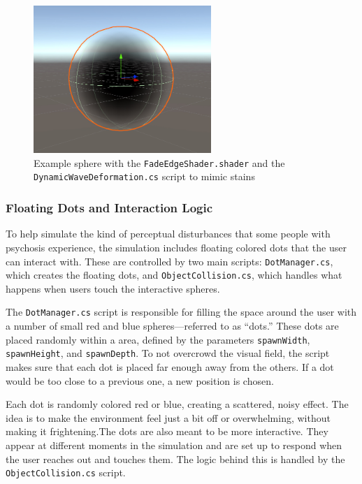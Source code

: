 \begin{figure}[h!] 
    \centering 
    \includegraphics[width=0.6\textwidth]{../../Figures/fadeedgeshader.jpg} 
    \caption{Example sphere with the \texttt{FadeEdgeShader.shader} and the \texttt{DynamicWaveDeformation.cs} script to mimic stains} 
    \label{fig:fadeedgeshader} 
\end{figure}

\subsubsection{Floating Dots and Interaction Logic}

To help simulate the kind of perceptual disturbances that some people with psychosis experience, the simulation includes floating colored dots that the user can interact with. These are controlled by two main scripts: \texttt{DotManager.cs}, which creates the floating dots, and \texttt{ObjectCollision.cs}, which handles what happens when users touch the interactive spheres.

\vspace{1em}

The \texttt{DotManager.cs} script is responsible for filling the space around the user with a number of small red and blue spheres—referred to as “dots.” These dots are placed randomly within a area, defined by the parameters \texttt{spawnWidth}, \texttt{spawnHeight}, and \texttt{spawnDepth}. To not overcrowd the visual field, the script makes sure that each dot is placed far enough away from the others. If a dot would be too close to a previous one, a new position is chosen.

\vspace{1em}

Each dot is randomly colored red or blue, creating a scattered, noisy effect. The idea is to make the environment feel just a bit off or overwhelming, without making it frightening.The dots are also meant to be more interactive. They appear at different moments in the simulation and are set up to respond when the user reaches out and touches them. The logic behind this is handled by the \texttt{ObjectCollision.cs} script.

